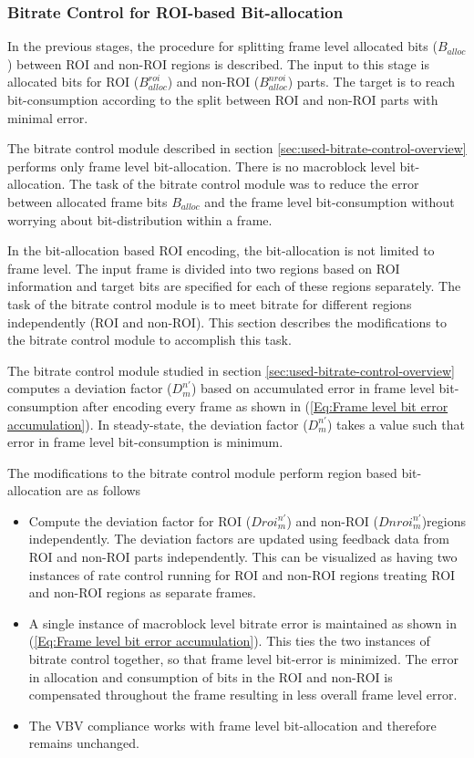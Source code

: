 \documentclass[11pt]{article} %
\begin{document}
\subsubsection{Bitrate Control for ROI-based Bit-allocation}
In the previous stages, the procedure for splitting frame level allocated bits ({$B_{alloc}$}) between ROI and non-ROI regions is described. The input to this stage is allocated bits for ROI ($B_{alloc}^{roi}$) and non-ROI ($B_{alloc}^{nroi}$) parts. The target is to reach bit-consumption according to the split between ROI and non-ROI parts with minimal error. 

The bitrate control module described in section \ref{sec:used-bitrate-control-overview} performs only frame level bit-allocation. There is no macroblock level bit-allocation. The task of the bitrate control module was to reduce the error between allocated frame bits $B_{alloc}$ and the frame level bit-consumption without worrying about bit-distribution within a frame. 

In the bit-allocation based ROI encoding, the bit-allocation is not limited to frame level. The input frame is divided into two regions based on ROI information and target bits are specified for each of these regions separately. The task of the bitrate control module is to meet bitrate for different regions independently (ROI and non-ROI). This section describes the modifications to the bitrate control module to accomplish this task.

The bitrate control module studied in section \ref{sec:used-bitrate-control-overview} computes a deviation factor ($D_m^{n'}$) based on accumulated error in frame level bit-consumption after encoding every frame as shown in (\ref{Eq:Frame level bit error accumulation}). In steady-state, the deviation factor ($D_m^{n'}$) takes a value such that error in frame level bit-consumption is minimum. 

The modifications to the bitrate control module perform region based bit-allocation are as follows
\begin{itemize}
	\item Compute the deviation factor for ROI ($Droi_m^{n'}$) and non-ROI ($Dnroi_m^{n'}$)regions independently. The deviation factors are updated using feedback data from ROI and non-ROI parts independently. This can be visualized as having two instances of rate control running for ROI and non-ROI regions treating ROI and non-ROI regions as separate frames.
	\item A single instance of macroblock level bitrate error is maintained as shown in (\ref{Eq:Frame level bit error accumulation}). This ties the two instances of bitrate control together, so that frame level bit-error is minimized. The error in allocation and consumption of bits in the ROI and non-ROI is compensated throughout the frame resulting in less overall frame level error.
	\item The VBV compliance works with frame level bit-allocation and therefore remains unchanged.
\end{itemize} 
\end{document}
